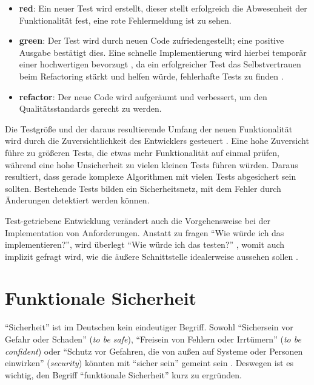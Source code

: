 \begin{itemize}
	\item \textbf{red}: Ein neuer Test wird erstellt, dieser stellt erfolgreich die Abwesenheit der Funktionalität fest, eine rote Fehlermeldung ist zu sehen.
	\item \textbf{green}: Der Test wird durch neuen Code zufriedengestellt; eine positive Ausgabe bestätigt dies. Eine schnelle Implementierung wird hierbei temporär einer hochwertigen bevorzugt \cite[24]{tdd}, da ein erfolgreicher Test das Selbstvertrauen beim Refactoring stärkt und helfen würde, fehlerhafte Tests zu finden \cite[152]{tdd}.
	\item \textbf{refactor}: Der neue Code wird aufgeräumt und verbessert, um den Qualitätsstandards gerecht zu werden.
\end{itemize}

Die Testgröße und der daraus resultierende Umfang der neuen Funktionalität wird durch die Zuversichtlichkeit des Entwicklers gesteuert \cite[42]{tdd}.
Eine hohe Zuversicht führe zu größeren Tests, die etwas mehr Funktionalität auf einmal prüfen, während eine hohe Unsicherheit zu vielen kleinen Tests führen würden.
Daraus resultiert, dass gerade komplexe Algorithmen mit vielen Tests abgesichert sein sollten.
Bestehende Tests bilden ein Sicherheitsnetz, mit dem Fehler durch Änderungen detektiert werden können.

Test-getriebene Entwicklung verändert auch die Vorgehensweise bei der Implementation von Anforderungen. Anstatt zu fragen \enquote{Wie würde ich das implementieren?}, wird überlegt \enquote{Wie würde ich das testen?} \cite[39]{tdd}, womit auch implizit gefragt wird, wie die äußere Schnittstelle idealerweise aussehen sollen \cite[4]{tdd}.





\section{Funktionale Sicherheit}
\label{com:safety}

\enquote{Sicherheit} ist im Deutschen kein eindeutiger Begriff.
Sowohl \enquote{Sichersein vor Gefahr oder Schaden} (\textit{to be safe}), \enquote{Freisein von Fehlern oder Irrtümern} (\textit{to be confident}) oder \enquote{Schutz vor Gefahren, die von außen auf Systeme oder Personen einwirken} (\textit{security}) könnten mit \enquote{sicher sein} gemeint sein \cite[5-6]{safety}.
Deswegen ist es wichtig, den Begriff \enquote{funktionale Sicherheit} kurz zu ergründen.

